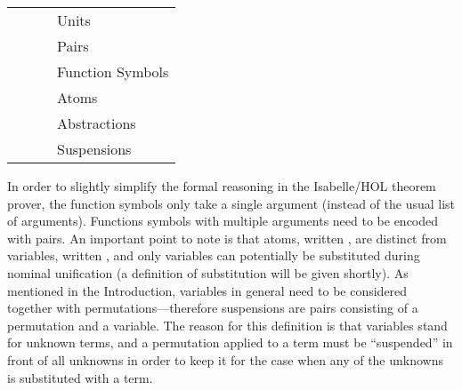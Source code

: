 \begin{isabellebody}
\begin{isamarkuptext}
  \begin{center}
  \begin{tabular}{rcll}
  \isa{trm} & \isa{{\isaliteral{3A}{\isacharcolon}}{\isaliteral{3A}{\isacharcolon}}{\isaliteral{3D}{\isacharequal}}} & \isa{{\isaliteral{5C3C6C616E676C653E}{\isasymlangle}}{\isaliteral{5C3C72616E676C653E}{\isasymrangle}}}       & Units\\
                & \isa{{\isaliteral{7C}{\isacharbar}}}   & \isa{{\isaliteral{5C3C6C616E676C653E}{\isasymlangle}}t\isaliteral{5C3C5E697375623E}{}\isactrlisub {\isadigit{1}}{\isaliteral{2C}{\isacharcomma}}\ t\isaliteral{5C3C5E697375623E}{}\isactrlisub {\isadigit{2}}{\isaliteral{5C3C72616E676C653E}{\isasymrangle}}} & Pairs\\
                & \isa{{\isaliteral{7C}{\isacharbar}}}   & \isa{f\ t}   & Function Symbols\\
                & \isa{{\isaliteral{7C}{\isacharbar}}}   & \isa{a}     & Atoms\\
                & \isa{{\isaliteral{7C}{\isacharbar}}}   & \isa{a{\isaliteral{2E}{\isachardot}}t}   & Abstractions\\
                & \isa{{\isaliteral{7C}{\isacharbar}}}   & \isa{{\isaliteral{5C3C70693E}{\isasympi}}{\isaliteral{5C3C63646F743E}{\isasymcdot}}X}   & Suspensions\\
  \end{tabular}
  \end{center}

  \noindent
  In order to slightly simplify the formal reasoning in the Isabelle/HOL
  theorem prover, the function symbols only take a single argument (instead of
  the usual list of arguments). Functions symbols with multiple arguments need
  to be encoded with pairs. An important point to note is that atoms,
  written , are distinct from variables, written , and only variables can potentially be substituted during nominal
  unification (a definition of substitution will be given shortly). As mentioned in the
  Introduction,
  variables in general need to be considered together with
  permutations---therefore suspensions are pairs consisting of a permutation and
  a variable. The reason for this definition is that variables stand for unknown 
  terms, and a permutation applied to a term must be 
  ``suspended'' in front of all unknowns in order to
  keep it for the case when any of the unknowns is substituted with a term.
  


\end{isamarkuptext}
\end{isabellebody}
